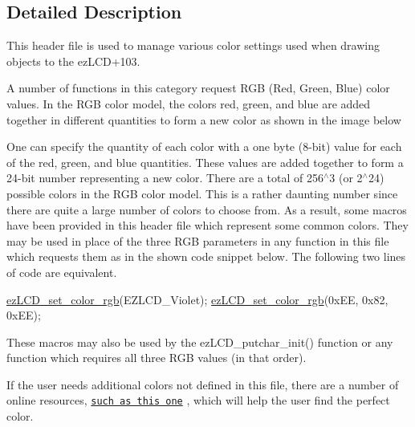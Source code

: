 \subsection{Detailed Description}
This header file is used to manage various color settings used when drawing objects to the ez\-L\-C\-D+103.

A number of functions in this category request R\-G\-B (Red, Green, Blue) color values. In the R\-G\-B color model, the colors red, green, and blue are added together in different quantities to form a new color as shown in the image below

 One can specify the quantity of each color with a one byte (8-\/bit) value for each of the red, green, and blue quantities. These values are added together to form a 24-\/bit number representing a new color. There are a total of 256$^\wedge$3 (or 2$^\wedge$24) possible colors in the R\-G\-B color model. This is a rather daunting number since there are quite a large number of colors to choose from. As a result, some macros have been provided in this header file which represent some common colors. They may be used in place of the three R\-G\-B parameters in any function in this file which requests them as in the shown code snippet below. The following two lines of code are equivalent.


\begin{DoxyCode}
\hyperlink{group__ez_l_c_d__103__colors_ga6b18ed4d0fb08b58b43a66a507a53dec}{ezLCD\_set\_color\_rgb}(EZLCD\_Violet);
\hyperlink{group__ez_l_c_d__103__colors_ga6b18ed4d0fb08b58b43a66a507a53dec}{ezLCD\_set\_color\_rgb}(0xEE, 0x82, 0xEE);
\end{DoxyCode}


These macros may also be used by the ez\-L\-C\-D\-\_\-putchar\-\_\-init() function or any function which requires all three R\-G\-B values (in that order).

If the user needs additional colors not defined in this file, there are a number of online resources, \href{http://www.rapidtables.com/web/color/RGB_Color.htm}{\tt such as this one} , which will help the user find the perfect color. 

